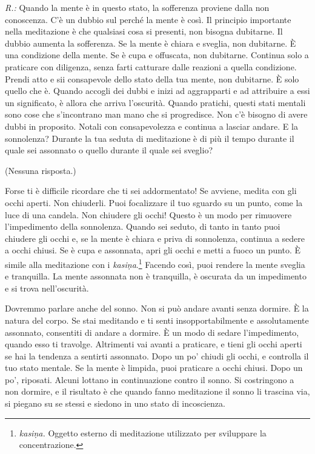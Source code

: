 \emph{R.:} Quando la mente è in questo stato, la sofferenza proviene dalla non
conoscenza. C'è un dubbio sul perché la mente è così. Il principio
importante nella meditazione è che qualsiasi cosa si presenti, non
bisogna dubitarne. Il dubbio aumenta la sofferenza. Se la mente è chiara
e sveglia, non dubitarne. È una condizione della mente. Se è cupa e
offuscata, non dubitarne. Continua solo a praticare con diligenza, senza
farti catturare dalle reazioni a quella condizione. Prendi atto e sii
consapevole dello stato della tua mente, non dubitarne. È solo quello
che è. Quando accogli dei dubbi e inizi ad aggrapparti e ad attribuire a
essi un significato, è allora che arriva l'oscurità. Quando pratichi,
questi stati mentali sono cose che s'incontrano man mano che si
progredisce. Non c'è bisogno di avere dubbi in proposito. Notali con
consapevolezza e continua a lasciar andare. E la sonnolenza? Durante la
tua seduta di meditazione è di più il tempo durante il quale sei
assonnato o quello durante il quale sei sveglio?

(Nessuna risposta.)

Forse ti è difficile ricordare che ti sei addormentato! Se avviene,
medita con gli occhi aperti. Non chiuderli. Puoi focalizzare il tuo
sguardo su un punto, come la luce di una candela. Non chiudere gli
occhi! Questo è un modo per rimuovere l'impedimento della sonnolenza.
Quando sei seduto, di tanto in tanto puoi chiudere gli occhi e, se la
mente è chiara e priva di sonnolenza, continua a sedere a occhi chiusi.
Se è cupa e assonnata, apri gli occhi e metti a fuoco un punto. È simile
alla meditazione con i \emph{kasiṇa}.\footnote{\emph{kasiṇa.} Oggetto
  esterno di meditazione utilizzato per sviluppare la concentrazione.}
Facendo così, puoi rendere la mente sveglia e tranquilla. La mente
assonnata non è tranquilla, è oscurata da un impedimento e si trova
nell'oscurità.

Dovremmo parlare anche del sonno. Non si può andare avanti senza
dormire. È la natura del corpo. Se stai meditando e ti senti
insopportabilmente e assolutamente assonnato, consentiti di andare a
dormire. È un modo di sedare l'impedimento, quando esso ti travolge.
Altrimenti vai avanti a praticare, e tieni gli occhi aperti se hai la
tendenza a sentirti assonnato. Dopo un po' chiudi gli occhi, e controlla
il tuo stato mentale. Se la mente è limpida, puoi praticare a occhi
chiusi. Dopo un po', riposati. Alcuni lottano in continuazione contro il
sonno. Si costringono a non dormire, e il risultato è che quando fanno
meditazione il sonno li trascina via, si piegano su se stessi e siedono
in uno stato di incoscienza.

